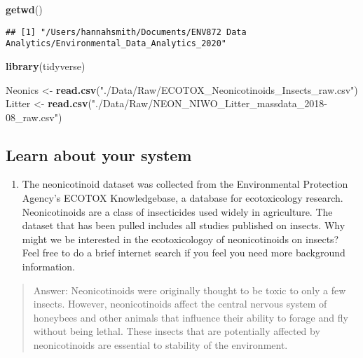\documentclass[]{article}
\newenvironment{Shaded}{\begin{snugshade}}{\end{snugshade}}
\newcommand{\KeywordTok}[1]{\textcolor[rgb]{0.13,0.29,0.53}{\textbf{#1}}}
\newcommand{\NormalTok}[1]{#1}
\newcommand{\StringTok}[1]{\textcolor[rgb]{0.31,0.60,0.02}{#1}}
\providecommand{\tightlist}{%
  \setlength{\itemsep}{0pt}\setlength{\parskip}{0pt}}
\begin{document}
\begin{Shaded}
\begin{Highlighting}[]
\KeywordTok{getwd}\NormalTok{()}
\end{Highlighting}
\end{Shaded}

\begin{verbatim}
## [1] "/Users/hannahsmith/Documents/ENV872 Data Analytics/Environmental_Data_Analytics_2020"
\end{verbatim}

\begin{Shaded}
\begin{Highlighting}[]
\KeywordTok{library}\NormalTok{(tidyverse)}

\NormalTok{Neonics <-}\StringTok{ }\KeywordTok{read.csv}\NormalTok{(}\StringTok{"./Data/Raw/ECOTOX_Neonicotinoids_Insects_raw.csv"}\NormalTok{)}
\NormalTok{Litter <-}\StringTok{ }\KeywordTok{read.csv}\NormalTok{(}\StringTok{"./Data/Raw/NEON_NIWO_Litter_massdata_2018-08_raw.csv"}\NormalTok{)}
\end{Highlighting}
\end{Shaded}

\hypertarget{learn-about-your-system}{%
\subsection{Learn about your system}\label{learn-about-your-system}}

\begin{enumerate}
\def\labelenumi{\arabic{enumi}.}
\setcounter{enumi}{1}
\tightlist
\item
  The neonicotinoid dataset was collected from the Environmental
  Protection Agency's ECOTOX Knowledgebase, a database for ecotoxicology
  research. Neonicotinoids are a class of insecticides used widely in
  agriculture. The dataset that has been pulled includes all studies
  published on insects. Why might we be interested in the ecotoxicologoy
  of neonicotinoids on insects? Feel free to do a brief internet search
  if you feel you need more background information.
\end{enumerate}

\begin{quote}
Answer: Neonicotinoids were originally thought to be toxic to only a few
insects. However, neonicotinoids affect the central nervous system of
honeybees and other animals that influence their ability to forage and
fly without being lethal. These insects that are potentially affected by
neonicotinoids are essential to stability of the environment.
\end{quote}
\end{document}
